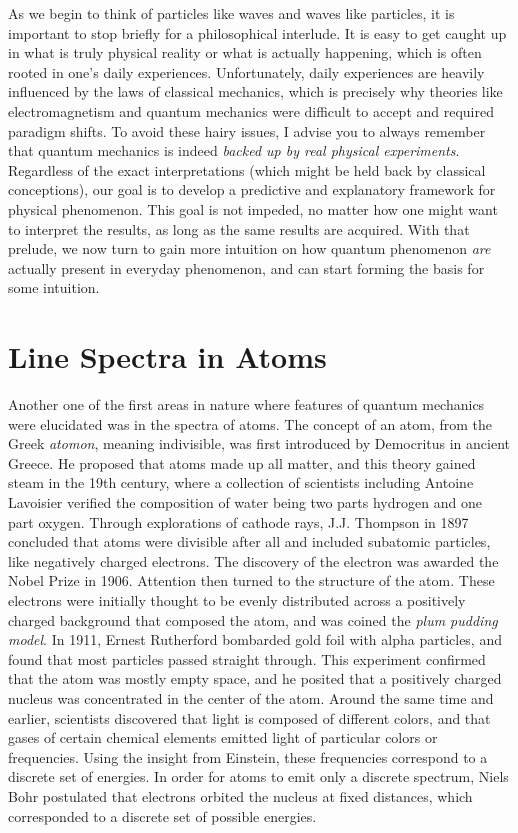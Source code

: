 As we begin to think of particles like waves and waves like particles, it is important to stop briefly for a philosophical interlude. It is easy to get caught up in what is truly physical reality or what is actually happening, which is often rooted in one's daily experiences. Unfortunately, daily experiences are heavily influenced by the laws of classical mechanics, which is precisely why theories like electromagnetism and quantum mechanics were difficult to accept and required paradigm shifts. To avoid these hairy issues, I advise you to always remember that quantum mechanics is indeed \textit{backed up by real physical experiments}. Regardless of the exact interpretations (which might be held back by classical conceptions), our goal is to develop a predictive and explanatory framework for physical phenomenon. This goal is not impeded, no matter how one might want to interpret the results, as long as the same results are acquired. With that prelude, we now turn to gain more intuition on how quantum phenomenon \textit{are} actually present in everyday phenomenon, and can start forming the basis for some intuition.  

\section{Line Spectra in Atoms}

Another one of the first areas in nature where features of quantum mechanics were elucidated was in the spectra of atoms. The concept of an atom, from the Greek \textit{atomon}, meaning indivisible, was first introduced by Democritus in ancient Greece. He proposed that atoms made up all matter, and this theory gained steam in the 19th century, where a collection of scientists including Antoine Lavoisier verified the composition of water being two parts hydrogen and one part oxygen. Through explorations of cathode rays, J.J. Thompson in 1897 concluded that atoms were divisible after all and included subatomic particles, like negatively charged electrons. The discovery of the electron was awarded the Nobel Prize in 1906. Attention then turned to the structure of the atom. These electrons were initially thought to be evenly distributed across a positively charged background that composed the atom, and was coined the \textit{plum pudding model}. In 1911, Ernest Rutherford bombarded gold foil with alpha particles, and found that most particles passed straight through. This experiment confirmed that the atom was mostly empty space, and he posited that a positively charged nucleus was concentrated in the center of the atom. Around the same time and earlier, scientists discovered that light is composed of different colors, and that gases of certain chemical elements emitted light of particular colors or frequencies. Using the insight from Einstein, these frequencies correspond to a discrete set of energies. In order for atoms to emit only a discrete spectrum, Niels Bohr postulated that electrons orbited the nucleus at fixed distances, which corresponded to a discrete set of possible energies.

